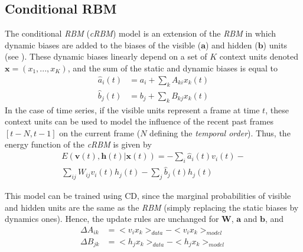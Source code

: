 \documentclass{article}
\begin{document}
\subsection{Conditional RBM}
The conditional \textit{RBM} (\textit{cRBM}) model \cite{taylor2009factored} is an extension of the \textit{RBM} in which dynamic biases are added to the biases of the visible ($\bm{a}$) and hidden ($\bm{b}$) units (see ). These dynamic biases linearly depend on a set of $K$ context units denoted $\bm{x} = (x_{1},...,x_{K})$, and the sum of the static and dynamic biases is equal to
\begin{align*}
\hat{a}_{i}(t) &= a_{i} + \sum_{k}A_{ki}x_{k}(t)\\
\hat{b}_{j}(t) &= b_{j} + \sum_{k}B_{kj}x_{k}(t)
\end{align*}
In the case of time series, if the visible units represent a frame at time $t$, these context units can be used to model the influence of the recent past frames $\left[ t-N, t-1 \right]$ on the current frame ($N$ defining the \textit{temporal order}).
Thus, the energy function of the \textit{cRBM} is given by
\begin{equation}
\begin{split}
\label{eq:energy_cRBM}
E(\bm{v}(t),\bm{h}(t)|\bm{x}(t)) =  - \sum_{i} \hat{a}_{i}(t)v_{i}(t) - \\ \sum_{ij}W_{ij}v_{i}(t)h_{j}(t) - \sum_{j} \hat{b}_{j}(t)h_{j}(t)
\end{split}
\end{equation}

This model can be trained using CD, since the marginal probabilities of visible and hidden units are the same as the \textit{RBM} (simply replacing the static biases by dynamics ones).
Hence, the update rules are unchanged for $\bm{W}$, $\bm{a}$ and $\bm{b}$, and
\begin{align}
\Delta A_{ik} 	&=<v_{i}x_{k} >_{data} - <v_{i}x_{k} >_{model}\\
\Delta B_{jk} 	&= <h_{j}x_{k} >_{data} - <h_{j}x_{k} >_{model}
\end{align}
\end{document}
